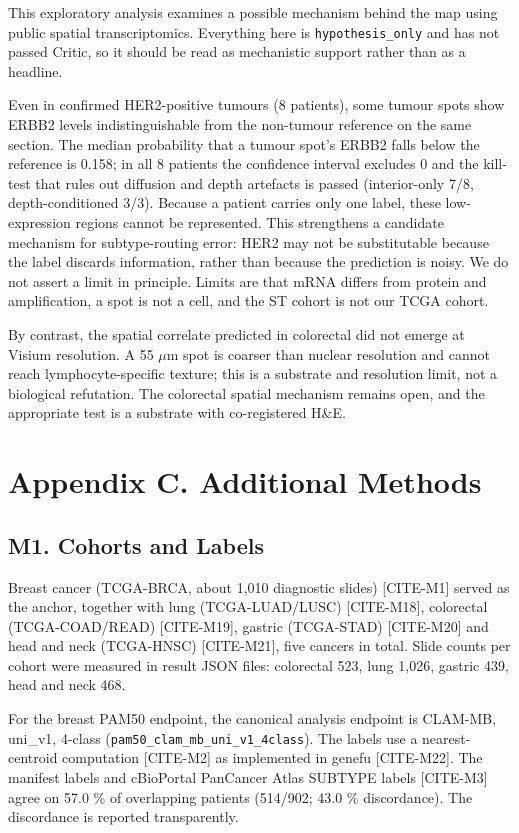 This exploratory analysis examines a possible mechanism behind the map using public spatial transcriptomics. Everything here is \texttt{hypothesis\_only} and has not passed Critic, so it should be read as mechanistic support rather than as a headline.

Even in confirmed HER2-positive tumours (8 patients), some tumour spots show ERBB2 levels indistinguishable from the non-tumour reference on the same section. The median probability that a tumour spot's ERBB2 falls below the reference is 0.158; in all 8 patients the confidence interval excludes 0 and the kill-test that rules out diffusion and depth artefacts is passed (interior-only 7/8, depth-conditioned 3/3). Because a patient carries only one label, these low-expression regions cannot be represented. This strengthens a candidate mechanism for subtype-routing error: HER2 may not be substitutable because the label discards information, rather than because the prediction is noisy. We do not assert a limit in principle. Limits are that mRNA differs from protein and amplification, a spot is not a cell, and the ST cohort is not our TCGA cohort.

By contrast, the spatial correlate predicted in colorectal did not emerge at Visium resolution. A 55 $\mu$m spot is coarser than nuclear resolution and cannot reach lymphocyte-specific texture; this is a substrate and resolution limit, not a biological refutation. The colorectal spatial mechanism remains open, and the appropriate test is a substrate with co-registered H\&E.

\section*{Appendix C. Additional Methods}

\subsection*{M1. Cohorts and Labels}

Breast cancer (TCGA-BRCA, about 1,010 diagnostic slides) [CITE-M1] served as the anchor, together with lung (TCGA-LUAD/LUSC) [CITE-M18], colorectal (TCGA-COAD/READ) [CITE-M19], gastric (TCGA-STAD) [CITE-M20] and head and neck (TCGA-HNSC) [CITE-M21], five cancers in total. Slide counts per cohort were measured in result JSON files: colorectal 523, lung 1,026, gastric 439, head and neck 468.

For the breast PAM50 endpoint, the canonical analysis endpoint is CLAM-MB, uni\_v1, 4-class (\texttt{pam50\_clam\_mb\_uni\_v1\_4class}). The labels use a nearest-centroid computation [CITE-M2] as implemented in genefu [CITE-M22]. The manifest labels and cBioPortal PanCancer Atlas SUBTYPE labels [CITE-M3] agree on 57.0 \% of overlapping patients (514/902; 43.0 \% discordance). The discordance is reported transparently.

